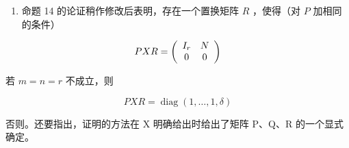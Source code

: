 \begin{enumerate}
\def\labelenumi{(\arabic{enumi})}
\setcounter{enumi}{1}
\tightlist
\item
  命题 14 的论证稍作修改后表明，存在一个置换矩阵 \(R\) ，使得（对 \(P\) 加相同的条件）
\end{enumerate}

\[
P X R = \left( \begin{array}{c c} I _ {r} & N \\ 0 & 0 \end{array} \right)
\]

若 \(m = n = r\) 不成立，则

\[
P X R = \operatorname{diag} (1, \dots , 1, \delta)
\]

否则。还要指出，证明的方法在 X 明确给出时给出了矩阵 P、Q、R 的一个显式确定。

